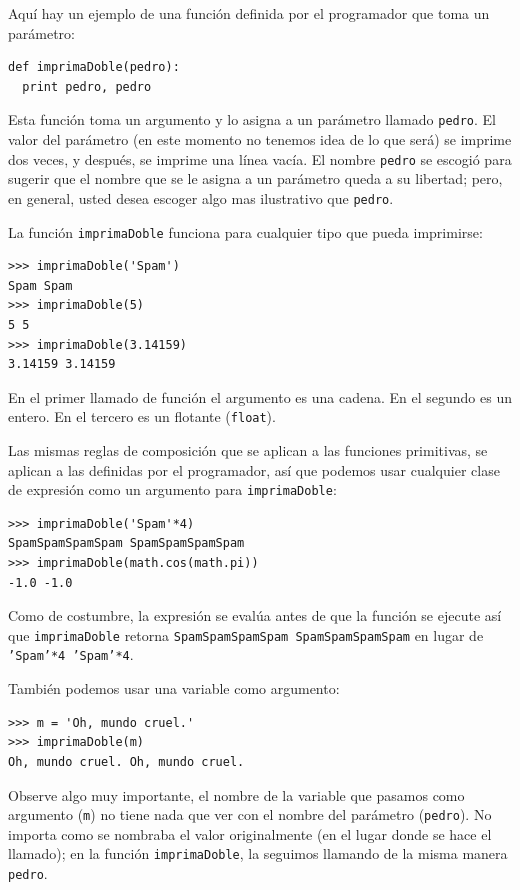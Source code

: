 Aquí hay un ejemplo de una función definida por el programador que toma un 
parámetro:

\beforeverb
\begin{verbatim}
def imprimaDoble(pedro):
  print pedro, pedro
\end{verbatim}
\afterverb
%
Esta función toma un argumento y lo asigna a un parámetro llamado \texttt{pedro}.  
El valor del parámetro (en este momento no tenemos idea de lo que será) se
imprime dos veces, y después, se imprime una línea vacía.
El nombre \texttt{pedro} se escogió para sugerir que el nombre que se le asigna a un
parámetro queda a su libertad; pero, en general, usted desea escoger algo mas
ilustrativo que \texttt{pedro}.

La función  \texttt{imprimaDoble} funciona para cualquier tipo que pueda
imprimirse:

\beforeverb
\begin{verbatim}
>>> imprimaDoble('Spam')
Spam Spam
>>> imprimaDoble(5)
5 5
>>> imprimaDoble(3.14159)
3.14159 3.14159
\end{verbatim}
\afterverb
%
En el primer llamado de función el argumento es una cadena. En el segundo es 
un entero. En el tercero es un flotante (\texttt{float}).

Las mismas reglas de composición que se aplican a las funciones primitivas,
se aplican a las definidas por el programador, así que podemos
usar cualquier clase de expresión como un argumento para  \texttt{imprimaDoble}:

\beforeverb
\begin{verbatim}
>>> imprimaDoble('Spam'*4)
SpamSpamSpamSpam SpamSpamSpamSpam
>>> imprimaDoble(math.cos(math.pi))
-1.0 -1.0
\end{verbatim}
\afterverb
%
Como de costumbre, la expresión se evalúa antes de que la función se ejecute
así que 
\texttt{imprimaDoble} retorna \texttt{SpamSpamSpamSpam SpamSpamSpamSpam} en lugar de
\texttt{'Spam'*4 'Spam'*4}.



También podemos usar una variable como argumento:

\beforeverb
\begin{verbatim}
>>> m = 'Oh, mundo cruel.'
>>> imprimaDoble(m)
Oh, mundo cruel. Oh, mundo cruel.
\end{verbatim}
\afterverb
%
Observe algo muy importante, el nombre de la variable que pasamos como
argumento  (\texttt{m}) no tiene nada que ver con el nombre del parámetro (\texttt{pedro}).  No importa como se nombraba el valor originalmente (en el lugar donde
se hace el llamado); en la función  \texttt{imprimaDoble}, la seguimos llamando de
la misma manera \texttt{pedro}.


